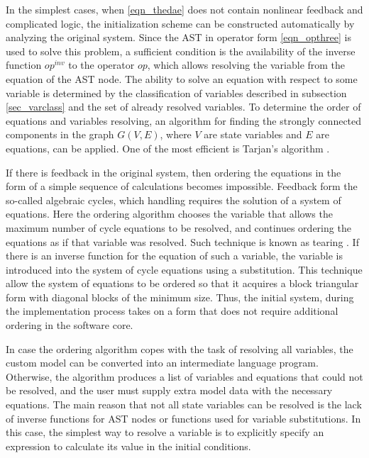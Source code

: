 \documentclass[lettersize,journal]{IEEEtran}
\begin{document}
In the simplest cases, when \eqref{eqn_thedae} does not contain nonlinear feedback and complicated logic, the initialization scheme can be constructed automatically by analyzing the original system. 
Since the AST in operator form \eqref{eqn_opthree} is used to solve this problem, a sufficient condition is the availability of the inverse 
function \(op^{inv}\) to the operator \(op\), which allows resolving the variable from the equation of the AST node. 
The ability to solve an equation with respect to some variable is determined by the classification of variables described in
subsection \ref{sec_varclass} and the set of already resolved variables. To determine the order of equations and variables resolving, 
an algorithm for finding the strongly connected components in the graph \(G(V,E)\), where \(V\) are state variables and \(E\) 
are equations, can be applied. One of the most efficient is Tarjan's algorithm \cite{texbook}.

If there is feedback in the original system, then ordering the equations in the form of a simple sequence of calculations
becomes impossible. Feedback form the so-called algebraic cycles, which handling requires the solution of a system of
equations. Here the ordering algorithm chooses the variable that allows the maximum number of cycle equations to be
resolved, and continues ordering the equations as if that variable was resolved. Such technique is known as tearing \cite{texbook}. If there is an inverse function for the
equation of such a variable, the variable is introduced into the system of cycle equations using a substitution. 
This technique allow the system of equations to be ordered so that it acquires a block triangular form with diagonal blocks of 
the minimum size. Thus, the initial system, during the implementation process takes on a form that does not require additional 
ordering in the software core.

In case the ordering algorithm copes with the task of resolving all variables, the custom model can be converted into an
intermediate language program. Otherwise, the algorithm produces a list of variables and equations that could not be resolved,
and the user must supply extra model data with the necessary equations. The main reason that not all 
state variables can be resolved is the lack of inverse functions for AST nodes or functions used for variable substitutions. 
In this case, the simplest way to resolve a variable is to explicitly specify an expression to calculate its value in the 
initial conditions.
\end{document}
